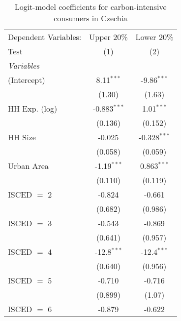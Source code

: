 
\begin{table}[htbp!]
   \centering
   \small
   \begin{adjustbox}{width = 1\textwidth, max height = 0.95\textheight, center}
      \begin{threeparttable}[b]
         \caption{\label{tab:Logit_1_CZE} Logit-model coefficients for carbon-intensive consumers in Czechia}
         \begin{tabular}{lcc}
            \tabularnewline \midrule \midrule
            Dependent Variables: & Upper 20\%     & Lower 20\%\\   
            Test                 & (1)            & (2)\\  
            \midrule
            \emph{Variables}\\
            (Intercept)          & 8.11$^{***}$   & -9.86$^{***}$\\   
                                 & (1.30)         & (1.63)\\   
            HH Exp. (log)        & -0.883$^{***}$ & 1.01$^{***}$\\   
                                 & (0.136)        & (0.152)\\   
            HH Size              & -0.025         & -0.328$^{***}$\\   
                                 & (0.058)        & (0.059)\\   
            Urban Area           & -1.19$^{***}$  & 0.863$^{***}$\\   
                                 & (0.110)        & (0.119)\\   
            ISCED $=$ 2          & -0.824         & -0.661\\   
                                 & (0.682)        & (0.986)\\   
            ISCED $=$ 3          & -0.543         & -0.869\\   
                                 & (0.641)        & (0.957)\\   
            ISCED $=$ 4          & -12.8$^{***}$  & -12.4$^{***}$\\   
                                 & (0.640)        & (0.956)\\   
            ISCED $=$ 5          & -0.710         & -0.716\\   
                                 & (0.899)        & (1.07)\\   
            ISCED $=$ 6          & -0.879         & -0.622\\   

\end{tabular}
\end{threeparttable}
\end{adjustbox}
\end{table}
